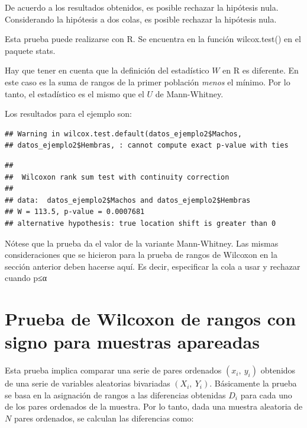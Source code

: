 \documentclass[]{book}
\newenvironment{Shaded}{\begin{snugshade}}{\end{snugshade}}
\newcommand{\DataTypeTok}[1]{\textcolor[rgb]{0.13,0.29,0.53}{#1}}
\newcommand{\KeywordTok}[1]{\textcolor[rgb]{0.13,0.29,0.53}{\textbf{#1}}}
\newcommand{\NormalTok}[1]{#1}
\newcommand{\OperatorTok}[1]{\textcolor[rgb]{0.81,0.36,0.00}{\textbf{#1}}}
\newcommand{\StringTok}[1]{\textcolor[rgb]{0.31,0.60,0.02}{#1}}
\theoremstyle{definition}
\theoremstyle{definition}
\theoremstyle{definition}
\theoremstyle{remark}
\begin{document}
De acuerdo a los resultados obtenidos, es posible rechazar la hipótesis
nula.\\
Considerando la hipótesis a dos colas, es posible rechazar la hipótesis
nula.

Esta prueba puede realizarse con R. Se encuentra en la función
wilcox.test() en el paquete stats.

Hay que tener en cuenta que la definición del estadístico \(W\) en R es
diferente. En este caso es la suma de rangos de la primer población
\emph{menos} el mínimo. Por lo tanto, el estadístico es el mismo que el
\(U\) de Mann-Whitney.

Los resultados para el ejemplo son:

\begin{Shaded}
\end{Shaded}

\begin{verbatim}
## Warning in wilcox.test.default(datos_ejemplo2$Machos,
## datos_ejemplo2$Hembras, : cannot compute exact p-value with ties
\end{verbatim}

\begin{verbatim}
## 
##  Wilcoxon rank sum test with continuity correction
## 
## data:  datos_ejemplo2$Machos and datos_ejemplo2$Hembras
## W = 113.5, p-value = 0.0007681
## alternative hypothesis: true location shift is greater than 0
\end{verbatim}

Nótese que la prueba da el valor de la variante Mann-Whitney. Las mismas
consideraciones que se hicieron para la prueba de rangos de Wilcoxon en
la sección anterior deben hacerse aquí. Es decir, especificar la cola a
usar y rechazar cuando p≤α

\hypertarget{prueba-de-wilcoxon-de-rangos-con-signo-para-muestras-apareadas}{%
\section{Prueba de Wilcoxon de rangos con signo para muestras
apareadas}\label{prueba-de-wilcoxon-de-rangos-con-signo-para-muestras-apareadas}}

Esta prueba implica comparar una serie de pares ordenados
\((x_{i},\ y_{i})\) obtenidos de una serie de variables aleatorias
bivariadas \((X_{i},\ Y_{i})\). Básicamente la prueba se basa en la
asignación de rangos a las diferencias obtenidas \(D_{i}\) para cada uno
de los pares ordenados de la muestra. Por lo tanto, dada una muestra
aleatoria de \(N\) pares ordenados, se calculan las diferencias como:
\end{document}
